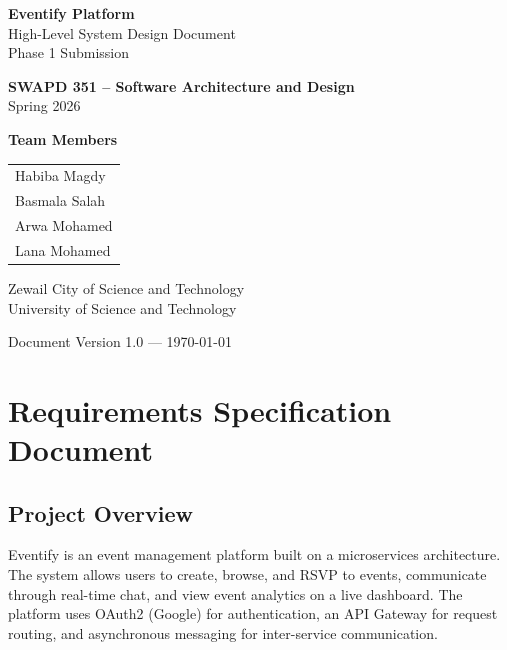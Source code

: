 \documentclass[12pt,a4paper]{article}
\begin{document}
\begin{titlepage}
\centering
\vspace*{1cm}

{\Huge\bfseries\color{zewailblue} Eventify Platform}\\[0.5cm]
{\Large High-Level System Design Document}\\[0.3cm]
{\large Phase 1 Submission}

\vspace{1.5cm}

{\large\textbf{SWAPD 351 -- Software Architecture and Design}}\\[0.3cm]
{\large Spring 2026}

\vspace{2cm}

{\large\textbf{Team Members}}\\[0.5cm]
\begin{tabular}{l}
Habiba Magdy \\
Basmala Salah \\
Arwa Mohamed \\
Lana Mohamed \\
\end{tabular}

\vspace{2cm}

{\large Zewail City of Science and Technology}\\[0.3cm]
{\large University of Science and Technology}

\vfill
{\small Document Version 1.0 --- \today}
\end{titlepage}

\tableofcontents
\newpage

\section{Requirements Specification Document}

\subsection{Project Overview}

Eventify is an event management platform built on a microservices architecture. The system allows users to create, browse, and RSVP to events, communicate through real-time chat, and view event analytics on a live dashboard. The platform uses OAuth2 (Google) for authentication, an API Gateway for request routing, and asynchronous messaging for inter-service communication.
\end{document}
